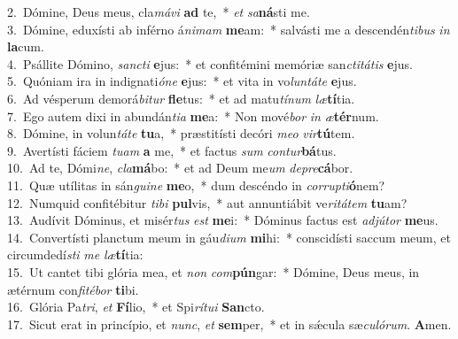 {2.~}Dómine, Deus meus, cla\textit{má}\textit{vi} \textbf{ad} te,~* \textit{et} \textit{sa}\textbf{ná}sti me.\\
{3.~}Dómine, eduxísti ab inférno á\textit{ni}\textit{mam} \textbf{me}am:~* salvásti me a descendén\textit{ti}\textit{bus} \textit{in} \textbf{la}cum.\\
{4.~}Psállite Dómino, \textit{san}\textit{cti} \textbf{e}jus:~* et confitémini memóriæ san\textit{cti}\textit{tá}\textit{tis} \textbf{e}jus.\\
{5.~}Quóniam ira in indignati\textit{ó}\textit{ne} \textbf{e}jus:~* et vita in vo\textit{lun}\textit{tá}\textit{te} \textbf{e}jus.\\
{6.~}Ad vésperum demorá\textit{bi}\textit{tur} \textbf{fle}tus:~* et ad matu\textit{tí}\textit{num} \textit{læ}\textbf{tí}tia.\\
{7.~}Ego autem dixi in abundán\textit{ti}\textit{a} \textbf{me}a:~* Non mové\textit{bor} \textit{in} \textit{æ}\textbf{tér}num.\\
{8.~}Dómine, in volun\textit{tá}\textit{te} \textbf{tu}a,~* præstitísti decóri \textit{me}\textit{o} \textit{vir}\textbf{tú}tem.\\
{9.~}Avertísti fáciem \textit{tu}\textit{am} \textbf{a} me,~* et factus \textit{sum} \textit{con}\textit{tur}\textbf{bá}tus.\\
{10.~}Ad te, Dómi\textit{ne}, \textit{cla}\textbf{má}bo:~* et ad Deum me\textit{um} \textit{de}\textit{pre}\textbf{cá}bor.\\
{11.~}Quæ utílitas in sán\textit{gui}\textit{ne} \textbf{me}o,~* dum descéndo in \textit{cor}\textit{rup}\textit{ti}\textbf{ó}nem?\\
{12.~}Numquid confitébitur \textit{ti}\textit{bi} \textbf{pul}vis,~* aut annuntiábit ve\textit{ri}\textit{tá}\textit{tem} \textbf{tu}am?\\
{13.~}Audívit Dóminus, et misér\textit{tus} \textit{est} \textbf{me}i:~* Dóminus factus est \textit{ad}\textit{jú}\textit{tor} \textbf{me}us.\\
{14.~}Convertísti planctum meum in gáu\textit{di}\textit{um} \textbf{mi}hi:~* conscidísti saccum meum, et circumdedí\textit{sti} \textit{me} \textit{læ}\textbf{tí}tia:\\
{15.~}Ut cantet tibi glória mea, et \textit{non} \textit{com}\textbf{pún}gar:~* Dómine, Deus meus, in ætérnum con\textit{fi}\textit{té}\textit{bor} \textbf{ti}bi.\\
{16.~}Glória Pa\textit{tri}, \textit{et} \textbf{Fí}lio,~* et Spi\textit{rí}\textit{tu}\textit{i} \textbf{San}cto.\\
{17.~}Sicut erat in princípio, et \textit{nunc}, \textit{et} \textbf{sem}per,~* et in sǽcula sæ\textit{cu}\textit{ló}\textit{rum}. \textbf{A}men.\\
